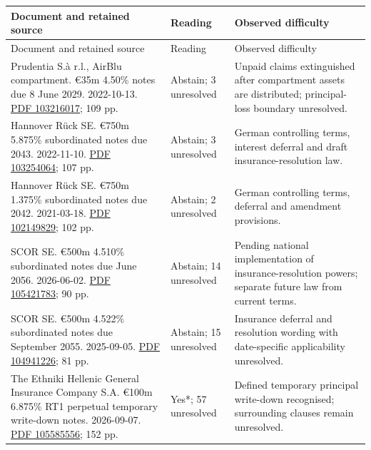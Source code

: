 \documentclass[12pt,a4paper,oneside,openany]{book}
\begin{document}
{\small
\begin{longtable}{P{0.44\textwidth}P{0.12\textwidth}P{0.34\textwidth}}
\toprule
Document and retained source & Reading & Observed difficulty \\
\midrule
\endfirsthead
\toprule
Document and retained source & Reading & Observed difficulty \\
\midrule
\endhead
Prudentia S.à r.l., AirBlu compartment. €35m 4.50\% notes due 8 June 2029. 2022-10-13. \href{../prospectus/difficulty-2026-10-04/pdfs/case-103216017.pdf}{PDF 103216017}; 109 pp. & Abstain; 3 unresolved & Unpaid claims extinguished after compartment assets are distributed; principal-loss boundary unresolved. \\

Hannover Rück SE. €750m 5.875\% subordinated notes due 2043. 2022-11-10. \href{../prospectus/difficulty-2026-10-04/pdfs/case-103254064.pdf}{PDF 103254064}; 107 pp. & Abstain; 3 unresolved & German controlling terms, interest deferral and draft insurance-resolution law. \\

Hannover Rück SE. €750m 1.375\% subordinated notes due 2042. 2021-03-18. \href{../prospectus/difficulty-2026-10-04/pdfs/case-102149829.pdf}{PDF 102149829}; 102 pp. & Abstain; 2 unresolved & German controlling terms, deferral and amendment provisions. \\

SCOR SE. €500m 4.510\% subordinated notes due June 2056. 2026-06-02. \href{../prospectus/difficulty-2026-10-04/pdfs/case-105421783.pdf}{PDF 105421783}; 90 pp. & Abstain; 14 unresolved & Pending national implementation of insurance-resolution powers; separate future law from current terms. \\

SCOR SE. €500m 4.522\% subordinated notes due September 2055. 2025-09-05. \href{../prospectus/difficulty-2026-10-04/pdfs/case-104941226.pdf}{PDF 104941226}; 81 pp. & Abstain; 15 unresolved & Insurance deferral and resolution wording with date-specific applicability unresolved. \\

The Ethniki Hellenic General Insurance Company S.A. €100m 6.875\% RT1 perpetual temporary write-down notes. 2026-09-07. \href{../prospectus/difficulty-2026-10-04/pdfs/case-105585556.pdf}{PDF 105585556}; 152 pp. & Yes*; 57 unresolved & Defined temporary principal write-down recognised; surrounding clauses remain unresolved. \\


\end{longtable}}
\end{document}

